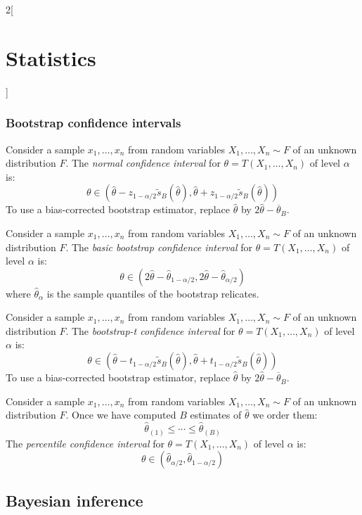 \documentclass[../../../main.tex]{subfiles}
\begin{document}
\begin{multicols}{2}[\section{Statistics}]
  \subsubsection{Bootstrap confidence intervals}
  \begin{definition}
    Consider a sample $x_1,\ldots,x_n$ from \iid random variables $X_1,\ldots,X_n\sim F$ of an unknown distribution $F$. The \emph{normal confidence interval} for $\theta=T(X_1,\ldots,X_n)$ of level $\alpha$ is: $$\theta\in(\hat\theta-z_{1-\alpha/2}\tilde{s}_B(\hat\theta),\hat\theta+z_{1-\alpha/2}\tilde{s}_B(\hat\theta))$$ To use a bias-corrected bootstrap estimator, replace ${\hat\theta}$ by $2{\hat\theta}-\overline{\theta}_B$.
  \end{definition}
  \begin{definition}
    Consider a sample $x_1,\ldots,x_n$ from \iid random variables $X_1,\ldots,X_n\sim F$ of an unknown distribution $F$. The \emph{basic bootstrap confidence interval} for $\theta=T(X_1,\ldots,X_n)$ of level $\alpha$ is: $$\theta\in(2\hat\theta-\hat\theta_{1-\alpha/2},2\hat\theta-\hat\theta_{\alpha/2})$$ where $\hat\theta_\alpha$ is the sample quantiles of the bootstrap relicates.
  \end{definition}
  \begin{definition}
    Consider a sample $x_1,\ldots,x_n$ from \iid random variables $X_1,\ldots,X_n\sim F$ of an unknown distribution $F$. The \emph{bootstrap-t confidence interval} for $\theta=T(X_1,\ldots,X_n)$ of level $\alpha$ is: $$\theta\in(\hat\theta-t_{1-\alpha/2}\tilde{s}_B(\hat\theta),\hat\theta+t_{1-\alpha/2}\tilde{s}_B(\hat\theta))$$ To use a bias-corrected bootstrap estimator, replace ${\hat\theta}$ by $2{\hat\theta}-\overline{\theta}_B$.
  \end{definition}
  \begin{definition}
    Consider a sample $x_1,\ldots,x_n$ from \iid random variables $X_1,\ldots,X_n\sim F$ of an unknown distribution $F$. Once we have computed $B$ estimates of $\hat\theta$ we order them:
    $${\hat\theta}_{(1)}\leq\cdots\leq{\hat\theta}_{(B)}$$
    The \emph{percentile confidence interval} for $\theta=T(X_1,\ldots,X_n)$ of level $\alpha$ is: $$\theta\in(\hat\theta_{\alpha/2},\hat\theta_{1-\alpha/2})$$
  \end{definition}
  \subsection{Bayesian inference}

\end{multicols}
\end{document}
